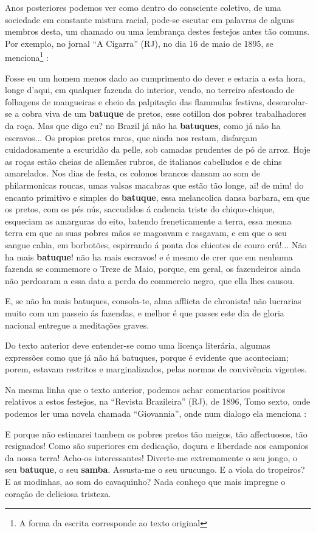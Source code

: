 Anos posteriores podemos ver como dentro do consciente coletivo, 
de uma sociedade em constante mistura racial, 
pode-se escutar em palavras de alguns membros desta,
um chamado ou uma lembrança destes festejos antes tão comuns.
Por exemplo, no jornal ``A Cigarra'' (RJ), 
no dia 16 de maio de 1895, se menciona\footnote{\label{footort4}A forma da escrita corresponde ao texto original} \cite[pp. 2]{batuqueperiodicoacigarra}:
\begin{citando}%
Fosse eu um homem menos dado 
ao cumprimento do dever e estaria a 
esta hora, longe d'aqui, em qualquer 
fazenda do interior, vendo, no terreiro 
afestoado de folhagens de mangueiras e
cheio da palpitação das flammulas 
festivas, desenrolar-se a cobra viva de um 
\textbf{batuque} de pretos, esse cotillon dos 
pobres trabalhadores da roça. Mas que digo
eu? no Brazil já não ha \textbf{batuques}, como 
já não ha escravos... Os propios pretos
raros, que ainda nos restam, disfarçam 
cuidadosamente a escuridão da pelle, sob
camadas prudentes de pó de arroz. Hoje 
as roças estão cheias de allemães rubros,
de italianos cabelludos e de chins amarelados.
Nos dias de festa, os colonos brancos
dansam ao som de philarmonicas 
roucas, umas valsas macabras que estão
tão longe, ai! de mim! do encanto primitivo
e simples do \textbf{batuque}, essa melancolica 
dansa barbara, em que os pretos,
com os pés nús, saccudidos á cadencia
triste do chique-chique, esqueciam as 
amarguras do eito, batendo freneticamente a terra,
essa mesma terra em que as suas pobres mãos 
se magoavam e rasgavam, e em que o seu sangue cahia,
em borbotões, espirrando á ponta dos chicotes de couro crú!...
Não ha mais \textbf{batuque}! não ha mais escravos! e é mesmo de
crer que em nenhuma fazenda se commemore o Treze de Maio, 
porque, em geral, os fazendeiros ainda não perdoaram
a essa data a perda do commercio negro, que ella lhes causou.

E, se não ha mais batuques, consola-te, alma afflicta de 
chronista! não lucrarias muito com um passeio ás fazendas,
e melhor é que passes este dia de gloria nacional entregue 
a meditações graves.
\end{citando}
Do texto anterior deve entender-se como uma licença literária, algumas expressões
como que já não há batuques, porque é evidente que aconteciam; porem, 
estavam restritos e marginalizados, pelas normas de convivência vigentes.

Na mesma linha que o texto anterior, 
podemos achar comentarios positivos relativos a estos festejos, na ``Revista Brazileira'' (RJ), 
de 1896, Tomo sexto, onde podemos ler uma novela chamada ``Giovannia'',
onde num dialogo ela menciona \cite[pp. 155]{batuqueperiodicorevistabrasileira}:
\begin{citando}%
E porque não estimarei tambem os pobres pretos tão meigos, tão 
affectuosos, tão resignados! Como são superiores em dedicação, doçura
e liberdade aos camponios da nossa terra! Acho-os interessantes! 
Diverte-me extremamente o seu jongo, o seu \textbf{batuque}, o seu \textbf{samba}.
Assusta-me o seu urucungo. E a viola do tropeiros? E as modinhas, ao 
som do cavaquinho? Nada conheço que mais impregne o coração de
deliciosa tristeza.
\end{citando}

